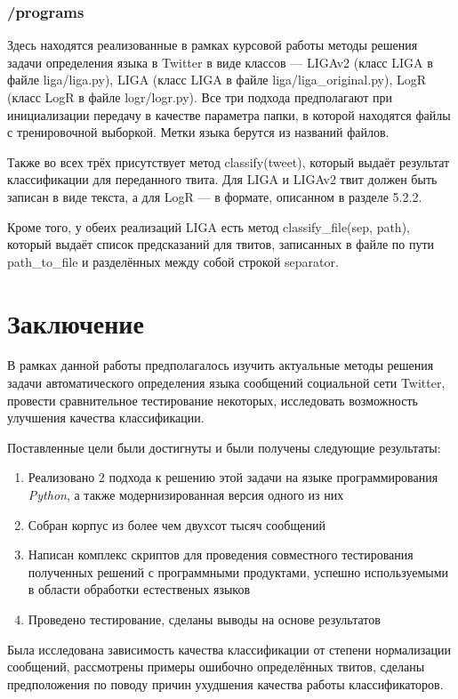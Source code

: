 \documentclass[a4paper, 14pt]{article}
\begin{document}
			\subsubsection{/programs}
				Здесь находятся реализованные в рамках курсовой работы методы решения задачи определения языка в Twitter в виде классов --- LIGAv2 (класс LIGA в файле liga/liga.py), LIGA (класс LIGA в файле liga/liga_original.py), LogR (класс LogR в файле logr/logr.py). Все три подхода
				предполагают при инициализации передачу в качестве параметра папки, в которой находятся файлы с тренировочной выборкой. Метки языка
				берутся из названий файлов.
				
				Также во всех трёх присутствует метод classify(tweet), который выдаёт результат классификации для переданного твита. Для LIGA и LIGAv2 твит должен быть записан в виде текста, а для LogR --- в формате, описанном в разделе 5.2.2.
				
				Кроме того, у обеих реализаций LIGA есть метод classify_file(sep, path), который выдаёт список предсказаний для твитов,
				записанных в файле по пути path_to_file и разделённых между собой строкой separator.

\pagebreak
	
\section{Заключение}
		В рамках данной работы предполагалось изучить актуальные методы решения задачи автоматического определения языка сообщений социальной сети Twitter, провести сравнительное тестирование некоторых, исследовать возможность улучшения качества классификации. 
		
		Поставленные цели были достигнуты и были получены следующие результаты:
		\begin{enumerate}
			\item Реализовано 2 подхода к решению этой задачи на языке программирования \textit{Python}, а также модернизированная версия одного из них
			\item Собран корпус из более чем двухсот тысяч сообщений
			\item Написан комплекс скриптов для проведения совместного тестирования полученных решений с программными продуктами, успешно используемыми в области обработки естественых языков
			\item Проведено тестирование, сделаны выводы на основе результатов
		\end{enumerate}
		Была исследована зависимость качества классификации от степени нормализации сообщений, 
		рассмотрены примеры ошибочно определённых твитов, сделаны предположения по поводу причин ухудшения качества работы классификаторов.
		
\end{document}
